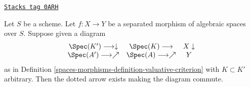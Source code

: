 \begin{lemma}
\label{spaces-morphisms-lemma-push-down-solution}
\href{https://stacks.math.columbia.edu/tag/0ARH}{\texttt{Stacks tag 0ARH}}

Let $S$ be a scheme. Let $f : X \to Y$ be a separated morphism of
algebraic spaces over $S$. Suppose given a diagram
$$
\begin{array}{ccc}\Spec(K') \longrightarrow\downarrow & \Spec(K) \longrightarrow & X \downarrow \\ \Spec(A') \longrightarrow\nearrow & \Spec(A) \longrightarrow\nearrow & Y\end{array}
$$
as in Definition \ref{spaces-morphisms-definition-valuative-criterion} with $K \subset K'$
arbitrary. Then the dotted arrow exists making the diagram commute.
\end{lemma}

